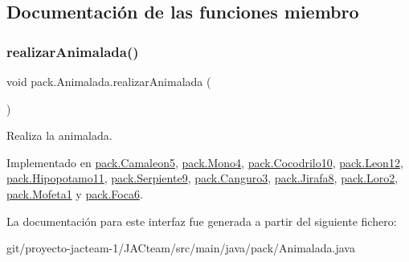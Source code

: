 \subsection{Documentación de las funciones miembro}
\mbox{\label{interfacepack_1_1_animalada_a5ba346bdbccde39f3ea438ae8cbf8c1b}} 
\subsubsection{\texorpdfstring{realizarAnimalada()}{realizarAnimalada()}}
{\footnotesize\ttfamily void pack.\+Animalada.\+realizar\+Animalada (\begin{DoxyParamCaption}{ }\end{DoxyParamCaption})}

Realiza la animalada. 

Implementado en \mbox{\hyperlink{classpack_1_1_camaleon5_a316574289ce95ac4714211bdea115d12}{pack.\+Camaleon5}}, \mbox{\hyperlink{classpack_1_1_mono4_a866ee4c7fbb9e67c3945fea72688cfb2}{pack.\+Mono4}}, \mbox{\hyperlink{classpack_1_1_cocodrilo10_a3964bbf5013220e0ee370fe543fced85}{pack.\+Cocodrilo10}}, \mbox{\hyperlink{classpack_1_1_leon12_aaf481d911d50c862f47b8d7f0c6dad34}{pack.\+Leon12}}, \mbox{\hyperlink{classpack_1_1_hipopotamo11_a0e022442d410e96055ba6bcd32897594}{pack.\+Hipopotamo11}}, \mbox{\hyperlink{classpack_1_1_serpiente9_ada2023f43022c857e23043edcbd58f86}{pack.\+Serpiente9}}, \mbox{\hyperlink{classpack_1_1_canguro3_af17d11ef1a9daab80ac2c48d9e7d8c37}{pack.\+Canguro3}}, \mbox{\hyperlink{classpack_1_1_jirafa8_a1432568b4e1f3b5f26b8e72984d11939}{pack.\+Jirafa8}}, \mbox{\hyperlink{classpack_1_1_loro2_a8e28b3452e5db8af320658d2aa070662}{pack.\+Loro2}}, \mbox{\hyperlink{classpack_1_1_mofeta1_ae3dbfbe207471c11f19e0acb5ffb8625}{pack.\+Mofeta1}} y \mbox{\hyperlink{classpack_1_1_foca6_a89a4181a4ff16b38a388e08d8bd68f8f}{pack.\+Foca6}}.



La documentación para este interfaz fue generada a partir del siguiente fichero\+:\begin{DoxyCompactItemize}
\item 
git/proyecto-\/jacteam-\/1/\+J\+A\+Cteam/src/main/java/pack/Animalada.\+java\end{DoxyCompactItemize}
